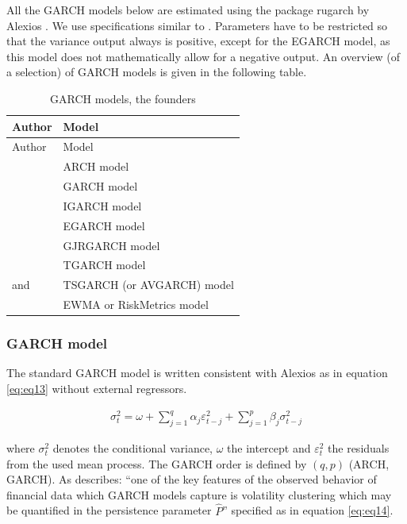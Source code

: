 \documentclass[a4paper, twoside]{templates/ociamthesis}
\begin{document}
All the GARCH models below are estimated using the package rugarch by Alexios \textcite{alexios2020}. We use specifications similar to \textcite{ghalanos2020}. Parameters have to be restricted so that the variance output always is positive, except for the EGARCH model, as this model does not mathematically allow for a negative output. An overview (of a selection) of GARCH models is given in the following table.

\begin{longtable}[]{@{}ll@{}}
\caption{GARCH models, the founders}\tabularnewline
\toprule
Author & Model\tabularnewline
\midrule
\endfirsthead
\toprule
Author & Model\tabularnewline
\midrule
\endhead
\textcite{engle1982} & ARCH model\tabularnewline
\textcite{bollerslev1986} & GARCH model\tabularnewline
\textcite{bollerslev1986} & IGARCH model\tabularnewline
\textcite{nelson1991} & EGARCH model\tabularnewline
\textcite{glosten1993} & GJRGARCH model\tabularnewline
\textcite{zakoian1994} & TGARCH model\tabularnewline
\textcite{taylor1986} and \textcite{schwert1989} & TSGARCH (or AVGARCH) model\tabularnewline
\textcite{morganguarantytrustcompany1996} & EWMA or RiskMetrics model\tabularnewline
\bottomrule
\end{longtable}

\newpage

\hypertarget{garch-model}{%
\subsubsection{GARCH model}\label{garch-model}}

\noindent The standard GARCH model \autocite{bollerslev1986} is written consistent with Alexios \textcite{ghalanos2020} as in equation \eqref{eq:eq13} without external regressors.

\begin{align}
\sigma_t^2 = \omega  + \sum\limits_{j = 1}^q {{\alpha_j}\varepsilon _{t-j}^2 +} \sum\limits_{j=1}^p {{\beta_j}\sigma_{t-j}^2} 
 \label{eq:eq13}
\end{align}

\noindent where \(\sigma_t^2\) denotes the conditional variance, \(\omega\) the intercept and \(\varepsilon_t^2\) the residuals from the used mean process. The GARCH order is defined by \((q, p)\) (ARCH, GARCH). As \textcite{ghalanos2020} describes: ``one of the key features of the observed behavior of financial data which GARCH models capture is volatility clustering which may be quantified in the persistence parameter \(\hat{P}\)'' specified as in equation \eqref{eq:eq14}.
\end{document}
